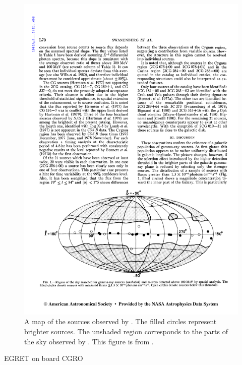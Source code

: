 \begin{figure}[htb]
\includegraphics[width=\textwidth]{chapters/introduction/figures/cos_b_2nd_catalog.pdf}
\caption{
A map of the sources observed by \cosb. The filled circles
represent brighter sources. The unshaded region corresponds to
the parts of the sky observed by \cosb.  This figure is from
\cite{swanenburg_1981_second-catalog}.
}
\end{figure}


\ac{EGRET} on board \ac{CGRO}



